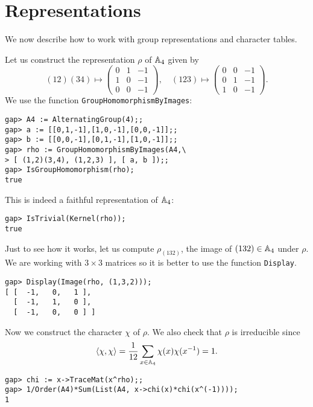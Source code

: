 \section{Representations}

We now describe how to work with 
group representations and character tables. 

\begin{example}
Let us construct the representation $\rho$ of $\mathbb{A}_4$ given by 
\begin{equation*}
  (12)(34)\mapsto\begin{pmatrix}
    0 & 1 & -1\\
    1 & 0 & -1\\
    0 & 0 & -1
  \end{pmatrix},
  \quad
  (123)\mapsto\begin{pmatrix}
    0 & 0 & -1\\
    0 & 1 & -1\\
    1 & 0 & -1
  \end{pmatrix}.
\end{equation*}
We use the function \lstinline{GroupHomomorphismByImages}: 
\begin{lstlisting}
gap> A4 := AlternatingGroup(4);;
gap> a := [[0,1,-1],[1,0,-1],[0,0,-1]];;
gap> b := [[0,0,-1],[0,1,-1],[1,0,-1]];;
gap> rho := GroupHomomorphismByImages(A4,\
> [ (1,2)(3,4), (1,2,3) ], [ a, b ]);;
gap> IsGroupHomomorphism(rho);
true
\end{lstlisting}
This is indeed a faithful representation of $\mathbb{A}_4$:
\begin{lstlisting}
gap> IsTrivial(Kernel(rho));
true
\end{lstlisting}
Just to see how it works, let us compute $\rho_{(132)}$, the image of
$(132)\in\mathbb{A}_4$ under $\rho$. We are working with $3\times 3$ matrices so it
is better to use the function
\lstinline{Display}.
\begin{lstlisting}
gap> Display(Image(rho, (1,3,2)));                                              
[ [  -1,   0,   1 ],
  [  -1,   1,   0 ],
  [  -1,   0,   0 ] ]
\end{lstlisting}
Now we construct the character $\chi$ of $\rho$. We also check that $\rho$ is
irreducible since 
\[
\langle\chi,\chi\rangle=\frac{1}{12}\sum_{x\in\mathbb{A}_4}\chi(x)\chi(x^{-1})=1.
\]
\begin{lstlisting}
gap> chi := x->TraceMat(x^rho);;
gap> 1/Order(A4)*Sum(List(A4, x->chi(x)*chi(x^(-1))));
1
\end{lstlisting}
\end{example}

